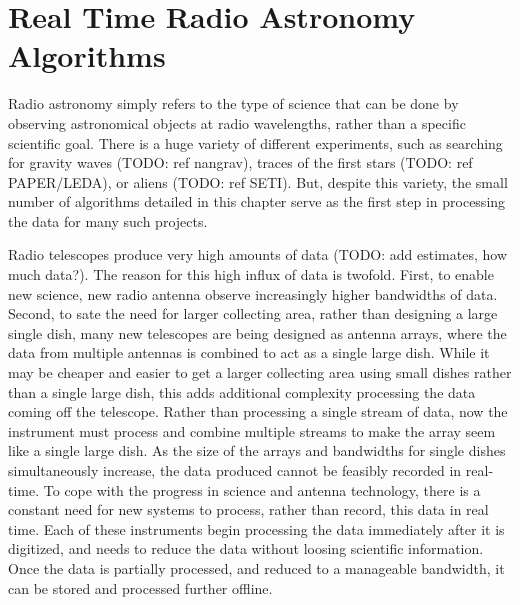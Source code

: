 \chapter{Real Time Radio Astronomy Algorithms}
\label{chap:Real Time Radio Astronomy Algorithms}




Radio astronomy simply refers to the type of science that can be done by observing astronomical objects at radio wavelengths, rather than a specific scientific goal. 
There is a huge variety of different experiments, such as searching for gravity waves (TODO: ref nangrav), traces of the first stars (TODO: ref PAPER/LEDA), or aliens (TODO: ref SETI).
But, despite this variety, the small number of algorithms detailed in this chapter serve as the first step in processing the data for many such projects.



Radio telescopes produce very high amounts of data (TODO: add estimates, how much data?). 
The reason for this high influx of data is twofold. 
First, to enable new science, new radio antenna observe increasingly higher bandwidths of data. 
Second, to sate the need for larger collecting area, rather than designing a large single dish, many new telescopes are being designed as antenna arrays, where the data from multiple antennas is combined to act as a single large dish.
While it may be cheaper and easier to get a larger collecting area using small dishes rather than a single large dish, this adds additional complexity processing the data coming off the telescope.
Rather than processing a single stream of data, now the instrument must process and combine multiple streams to make the array seem like a single large dish.
As the size of the arrays and bandwidths for single dishes simultaneously increase, the data produced cannot be feasibly recorded in real-time. 
To cope with the progress in science and antenna technology, there is a constant need for new systems to process, rather than record, this data in real time.
Each of these instruments begin processing the data immediately after it is digitized, and needs to reduce the data without loosing scientific information.
Once the data is partially processed, and reduced to a manageable bandwidth, it can be stored and processed further offline.


